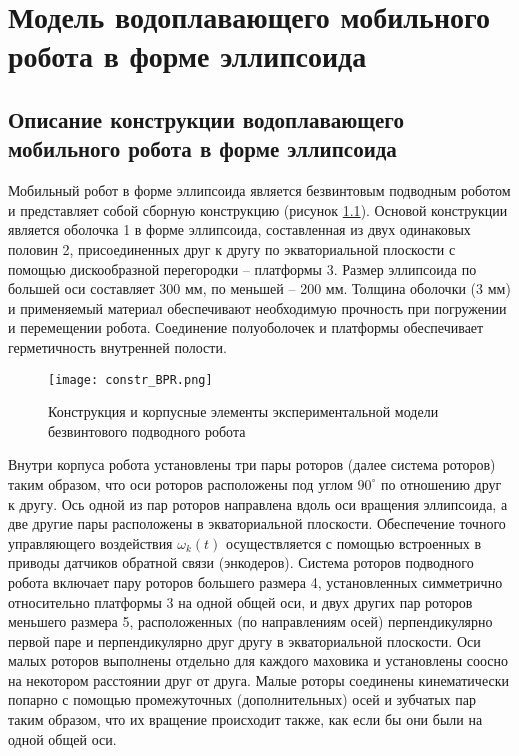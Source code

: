 \chapter{Модель водоплавающего мобильного робота в форме эллипсоида}\label{ch:ch3}

\section{Описание конструкции водоплавающего мобильного робота в форме эллипсоида}

Мобильный робот в форме эллипсоида является безвинтовым подводным роботом и представляет собой сборную конструкцию (рисунок \ref{constr_BPR}). Основой конструкции является оболочка 1 в форме эллипсоида, составленная из двух одинаковых половин 2, присоединенных друг к другу по экваториальной плоскости с помощью дискообразной перегородки – платформы 3. Размер эллипсоида по большей оси составляет 300 мм, по меньшей – 200 мм. Толщина оболочки (3 мм) и применяемый материал обеспечивают необходимую прочность при погружении и перемещении робота. Соединение полуоболочек и платформы обеспечивает герметичность внутренней полости.

\begin{figure}[h]
	\centering
	\texttt{[image: constr\_BPR.png]}%
	\caption{Конструкция и корпусные элементы экспериментальной модели безвинтового подводного робота}
	\label{constr_BPR}
\end{figure}

Внутри корпуса робота установлены три пары роторов (далее система роторов) таким образом, что оси роторов расположены под углом $90^\circ$ по отношению друг к другу. Ось одной из пар роторов направлена вдоль оси вращения эллипсоида, а две другие пары расположены в экваториальной плоскости. Обеспечение точного управляющего воздействия $\omega_k (t)$ осуществляется с помощью встроенных в приводы датчиков обратной связи (энкодеров). Система роторов подводного робота включает пару роторов большего размера 4, установленных симметрично относительно платформы 3 на одной общей оси, и двух других пар роторов меньшего размера 5, расположенных (по направлениям осей) перпендикулярно первой паре и перпендикулярно друг другу в экваториальной плоскости. Оси малых роторов выполнены отдельно для каждого маховика и установлены соосно на некотором расстоянии друг от друга. Малые роторы соединены кинематически попарно с помощью промежуточных (дополнительных) осей и зубчатых пар таким образом, что их вращение происходит также, как если бы они были на одной общей оси.

